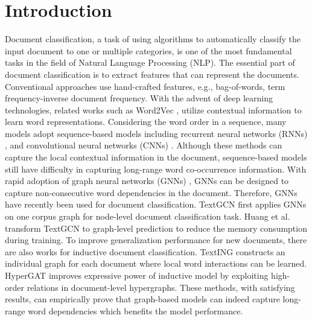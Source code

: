 \documentclass[letterpaper]{article} %
\begin{document}
\section{Introduction}
Document classification, a task of using algorithms to automatically classify the input document to one or multiple categories, is one of the most fundamental tasks in the field of Natural Language Processing (NLP).
The essential part of document classification is to extract features that can represent the documents. 
Conventional approaches use hand-crafted features, e.g., bag-of-words, term frequency-inverse document frequency.
With the advent of deep learning technologies, related works such as Word2Vec \cite{mikolov2013distributed}, utilize contextual information to learn word representations.
Considering the word order in a sequence, many models adopt sequence-based models including recurrent neural networks (RNNs) \cite{mikolov2010recurrent, tai2015improved, liu2016recurrent}, and convolutional neural networks (CNNs) \cite{kim-2014-convolutional, zhang2015character}.
Although these methods can capture the local contextual information in the document, sequence-based models still have difficulty in capturing long-range word co-occurrence information.
With rapid adoption of graph neural networks (GNNs) \cite{kipf2017semi}, GNNs can be designed to capture non-consecutive word dependencies in the document. Therefore, GNNs have recently been used for document classification. 
TextGCN \cite{yao2019graph} first applies GNNs on one corpus graph for node-level document classification task.
Huang et al. \cite{huang2019text} transform TextGCN to graph-level prediction to reduce the memory consumption during training.
To improve generalization performance for new documents, there are also works for inductive document classification. TextING \cite{zhang2020every} constructs an individual graph for each document where local word interactions can be learned. HyperGAT \cite{ding2020more} improves expressive power of inductive model by exploiting high-order relations in document-level hypergraphs.
These methods, with satisfying results, can empirically prove that graph-based models can indeed capture long-range word dependencies which benefits the model performance.
\end{document}
